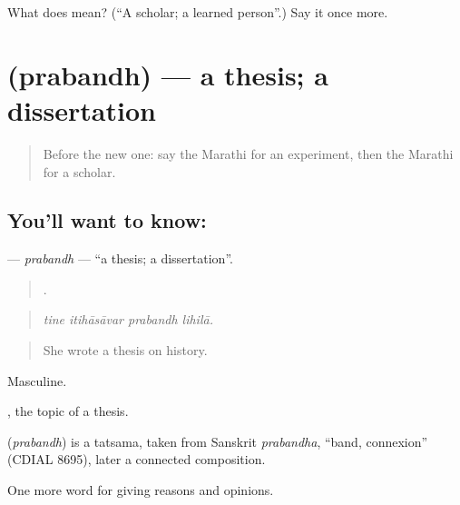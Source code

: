 \begin{tcolorbox}[breakable,colback=teal!4,colframe=teal!35!black,title={Before you move on}]
What does  mean? (\textquotedblleft{}A scholar; a learned person\textquotedblright{}.) Say it once more.
\end{tcolorbox}
\section[\texorpdfstring{\mr{प्रबंध} (prabandh)}{प्रबंध (prabandh)}]{ (prabandh) — a thesis; a dissertation}

\label{lesson:MR-C372-prabandh}



\begin{quote}
Before the new one: say the Marathi for an experiment, then the Marathi for a scholar.
\end{quote}

\subsection*{You'll want to know: }
\textbf{} — \emph{prabandh} — \textquotedblleft{}a thesis; a dissertation\textquotedblright{}.

\begin{quote}
   .
\end{quote}

\begin{quote}
\emph{tine itihāsāvar prabandh lihilā.}
\end{quote}

\begin{quote}
She wrote a thesis on history.
\end{quote}

Masculine.

 , the topic of a thesis.

\begin{cousinweb}
\textbf{} (\emph{prabandh}) is a tatsama, taken from Sanskrit \emph{prabandha}, \textquotedblleft{}band, connexion\textquotedblright{} (CDIAL 8695), later a connected composition.
\end{cousinweb}

\begin{grammarlens}[title={What you've built}]
One more word for giving reasons and opinions.
\end{grammarlens}

